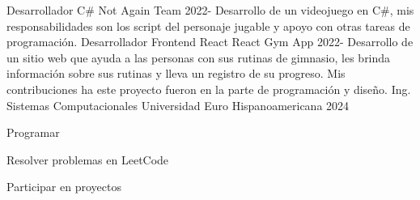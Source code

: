 \documentclass[11pt]{spidercv}
\begin{document}
    \begin{MainPart}

    \Experience
        {\ColorHighlight}
		{Desarrollador C\#}
		{Not Again Team}
        {2022-\faUndo}
        {
	        Desarrollo de un videojuego en C\#, mis responsabilidades son los script del personaje jugable y apoyo con otras tareas de programación.   
        }
    \Experience
	{\ColorHighlight}
		{Desarrollador Frontend React}
		{React Gym App}
	{2022-\faUndo}
	{
		Desarrollo de un sitio web que ayuda a las personas con sus rutinas de gimnasio, les brinda información sobre sus rutinas y lleva un registro de su progreso. Mis contribuciones ha este proyecto fueron en la parte de programación y diseño.
 	}   
    \Experience
        {\ColorHighlight}
		{Ing. Sistemas Computacionales}
		{Universidad Euro Hispanoamericana}
        {2024}
        {   
 		
        }

    \vspace*{0.5cm}
    \begin{DoubleColumns}
        \begin{ItemList}{\ColorHighlight}
            \item [] Programar
            \item [] Resolver problemas en LeetCode
        \end{ItemList}
        \nextcolumn
        \begin{ItemList}{\ColorHighlight}
            \item [] Participar en proyectos
        \end{ItemList}
    \end{DoubleColumns}

    \end{MainPart}

    
\end{document}
